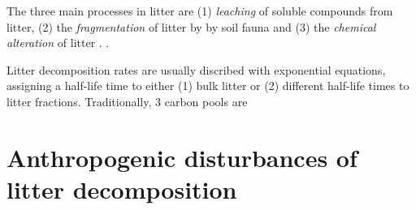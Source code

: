 The three main processes in litter are (1) \emph{leaching} of soluble compounds from litter, (2) the \emph{fragmentation} of litter by by soil fauna and (3) the \emph{chemical alteration} of litter \citep[pp. 152f]{Chapin2002}. .

Litter decomposition rates are usually discribed with exponential equations, assigning a half-life time to either (1) bulk litter or (2) different half-life times to litter fractions. Traditionally, 3 carbon pools are 
\cite{Berg1980}

\section{Anthropogenic disturbances of litter decomposition}

% 
% 
% 
% 
% 
% 
% 
% 
% 
% 
% 
